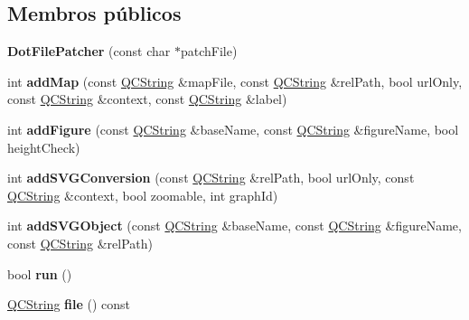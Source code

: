 \subsection*{Membros públicos}
\begin{DoxyCompactItemize}
\item 
\hypertarget{class_dot_file_patcher_ac556ae7fe2ed1199eee7698a58b0f574}{{\bfseries Dot\-File\-Patcher} (const char $\ast$patch\-File)}\label{class_dot_file_patcher_ac556ae7fe2ed1199eee7698a58b0f574}

\item 
\hypertarget{class_dot_file_patcher_ade2bd71a051104f985ec798fddfd6255}{int {\bfseries add\-Map} (const \hyperlink{class_q_c_string}{Q\-C\-String} \&map\-File, const \hyperlink{class_q_c_string}{Q\-C\-String} \&rel\-Path, bool url\-Only, const \hyperlink{class_q_c_string}{Q\-C\-String} \&context, const \hyperlink{class_q_c_string}{Q\-C\-String} \&label)}\label{class_dot_file_patcher_ade2bd71a051104f985ec798fddfd6255}

\item 
\hypertarget{class_dot_file_patcher_a1dab4a26ebe581010dd47fce9b252433}{int {\bfseries add\-Figure} (const \hyperlink{class_q_c_string}{Q\-C\-String} \&base\-Name, const \hyperlink{class_q_c_string}{Q\-C\-String} \&figure\-Name, bool height\-Check)}\label{class_dot_file_patcher_a1dab4a26ebe581010dd47fce9b252433}

\item 
\hypertarget{class_dot_file_patcher_a33e2ade632be272cabd3dcd5ca649517}{int {\bfseries add\-S\-V\-G\-Conversion} (const \hyperlink{class_q_c_string}{Q\-C\-String} \&rel\-Path, bool url\-Only, const \hyperlink{class_q_c_string}{Q\-C\-String} \&context, bool zoomable, int graph\-Id)}\label{class_dot_file_patcher_a33e2ade632be272cabd3dcd5ca649517}

\item 
\hypertarget{class_dot_file_patcher_a4fed8e639326ca3e917bfd7440af5b91}{int {\bfseries add\-S\-V\-G\-Object} (const \hyperlink{class_q_c_string}{Q\-C\-String} \&base\-Name, const \hyperlink{class_q_c_string}{Q\-C\-String} \&figure\-Name, const \hyperlink{class_q_c_string}{Q\-C\-String} \&rel\-Path)}\label{class_dot_file_patcher_a4fed8e639326ca3e917bfd7440af5b91}

\item 
\hypertarget{class_dot_file_patcher_a149ad6701e3e2414cb566bb414029841}{bool {\bfseries run} ()}\label{class_dot_file_patcher_a149ad6701e3e2414cb566bb414029841}

\item 
\hypertarget{class_dot_file_patcher_aeaa8cdb0fbabc1058b7d3813f2fd223b}{\hyperlink{class_q_c_string}{Q\-C\-String} {\bfseries file} () const }\label{class_dot_file_patcher_aeaa8cdb0fbabc1058b7d3813f2fd223b}

\end{DoxyCompactItemize}


